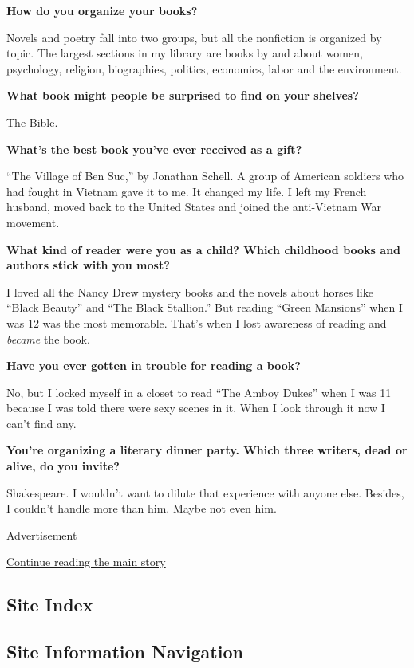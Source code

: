 \textbf{How do you organize your books?}

Novels and poetry fall into two groups, but all the nonfiction is
organized by topic. The largest sections in my library are books by and
about women, psychology, religion, biographies, politics, economics,
labor and the environment.

\textbf{What book might people be surprised to find on your shelves?}

The Bible.

\textbf{What's the best book you've ever received as a gift?}

``The Village of Ben Suc,'' by Jonathan Schell. A group of American
soldiers who had fought in Vietnam gave it to me. It changed my life. I
left my French husband, moved back to the United States and joined the
anti-Vietnam War movement.

\textbf{What kind of reader were you as a child? Which childhood books
and authors stick with you most?}

I loved all the Nancy Drew mystery books and the novels about horses
like ``Black Beauty'' and ``The Black Stallion.'' But reading ``Green
Mansions'' when I was 12 was the most memorable. That's when I lost
awareness of reading and \emph{became} the book.

\textbf{Have you ever gotten in trouble for reading a book?}

No, but I locked myself in a closet to read ``The Amboy Dukes'' when I
was 11 because I was told there were sexy scenes in it. When I look
through it now I can't find any.

\textbf{You're organizing a literary dinner party. Which three writers,
dead or alive, do you invite?}

Shakespeare. I wouldn't want to dilute that experience with anyone else.
Besides, I couldn't handle more than him. Maybe not even him.

Advertisement

\protect\hyperlink{after-bottom}{Continue reading the main story}

\hypertarget{site-index}{%
\subsection{Site Index}\label{site-index}}

\hypertarget{site-information-navigation}{%
\subsection{Site Information
Navigation}\label{site-information-navigation}}

